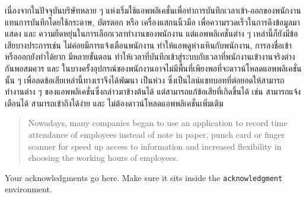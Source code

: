 \maketitle
\makesignature

\ifproject
\begin{abstractTH}

เนื่องจากในปัจจุบันบริษัทหลาย ๆ แห่งเริ่มใช้แอพพลิเคชั่นเพื่อทำการบันทึกเวลาเข้า-ออกของพนักงาน แทนการบันทึกโดยใช้กระดาษ, บัตรตอก หรือ เครื่องแสกนนิ้วมือ
\enskip เพื่อความรวดเร็วในการดึงข้อมูลมาแสดง และ ความยืดหยุ่นในการเลือกเวลาทำงานของพนักงาน
\enskip แต่แอพพลิเคชั่นต่าง ๆ เหล่านี้ก็ยังมีข้อเสียบางประการเช่น ไม่ค่อยมีการแจ้งเตือนพนักงาน ทำให้แอพดูห่างเหินกับพนักงาน, 
การลงชื่อเข้าหรือออกยังทำได้ยาก มีหลายขั้นตอน ทำให้เวลาที่บันทึกเข้าสู่ระบบกับเวลาที่พนักงานเข้างานจริงต่างกันพอสมควร 
และ ในบางครั้งอุปกรณ์ของพนักงานอาจไม่มีพื้นที่เพียงพอที่จะดาวน์โหลดแอพพลิเคชั่นนั้น ๆ
\enskip เพื่อลดข้อเสียเหล่านี้ทางเราจึงได้พัฒนา เป็นห่วง ซึ่งเป็นไลน์แชทบอทที่ต่อยอดให้สามารถทำงานต่าง ๆ ของแอพพลิเคชั่นซึ่งกล่าวมาข้างต้นได้
แต่สามารถแก้ข้อเสียที่เกิดขึ้นได้ เช่น สามารถแจ้งเตือนได้ สามารถเข้าถึงได้ง่าย และ ไม่ต้องดาวน์โหลดแอพพลิเคชั่นเพิ่มเติม
\end{abstractTH}


\begin{abstract}
Nowadays, many companies began to use an application to record time attendance of employees instead of note in paper, punch card or finger scanner 
for speed up access to information and increased flexibility in choosing the working hours of employees.
\end{abstract}

\iffalse
\begin{dedication}
This document is dedicated to all Chiang Mai University students.

Dedication page is optional.
\end{dedication}
\fi %

\begin{acknowledgments}
Your acknowledgments go here. Make sure it sits inside the
\texttt{acknowledgment} environment.

\end{acknowledgments}%
\fi %

\contentspage

\ifproject
\figurelistpage

\tablelistpage
\fi %



